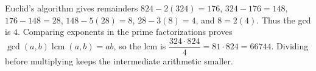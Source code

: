 Euclid's algorithm gives remainders $ 824-2(324)=176 $, $ 324-176=148 $, $ 176-148=28 $, $ 148-5(28)=8 $, $ 28-3(8)=4 $, and $ 8=2(4)$. Thus the gcd is $\boxed4 $. Comparing exponents in the prime factorizations proves $\gcd(a,b)\operatorname{lcm}(a,b)=ab $, so the lcm is $\dfrac{324\cdot824}{4}=81\cdot824=\boxed{66744}$. Dividing before multiplying keeps the intermediate arithmetic smaller.
